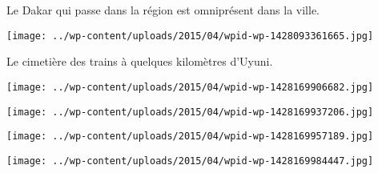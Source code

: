 \pagebreak
 Le Dakar qui passe dans la région est omniprésent dans la ville. 
\begin{center} \texttt{[image: ../wp-content/uploads/2015/04/wpid-wp-1428093361665.jpg]} \end{center}

 Le cimetière des trains à quelques kilomètres d'Uyuni. 
\begin{center} \texttt{[image: ../wp-content/uploads/2015/04/wpid-wp-1428169906682.jpg]} \end{center}
\begin{center} \texttt{[image: ../wp-content/uploads/2015/04/wpid-wp-1428169937206.jpg]} \end{center}
\begin{center} \texttt{[image: ../wp-content/uploads/2015/04/wpid-wp-1428169957189.jpg]} \end{center}
\begin{center} \texttt{[image: ../wp-content/uploads/2015/04/wpid-wp-1428169984447.jpg]} \end{center}
